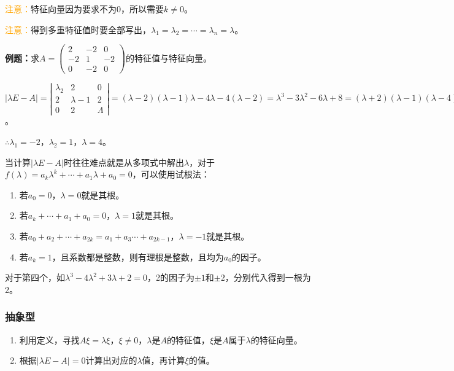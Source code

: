 \documentclass[UTF8, 12pt]{ctexart}
\begin{document}
\textcolor{orange}{注意：}特征向量因为要求不为0，所以需要$k\neq0$。

\textcolor{orange}{注意：}得到多重特征值时要全部写出，$\lambda_1=\lambda_2=\cdots=\lambda_n=\lambda$。

\textbf{例题：}求$A=\left(\begin{array}{ccc}
    2 & -2 & 0 \\
    -2 & 1 & -2 \\
    0 & -2 & 0
\end{array}\right)$的特征值与特征向量。

$\vert\lambda E-A\vert=\left|\begin{array}{ccc}
    \lambda_2 & 2 & 0 \\
    2 & \lambda-1 & 2 \\
    0 & 2 & \Lambda
\end{array}\right|=(\lambda-2)(\lambda-1)\lambda-4\lambda-4(\lambda-2)=\lambda^3-3\lambda^2-6\lambda+8=(\lambda+2)(\lambda-1)(\lambda-4)=0$。

$\therefore\lambda_1=-2$，$\lambda_2=1$，$\lambda=4$。

当计算$\vert\lambda E-A\vert$时往往难点就是从多项式中解出$\lambda$，对于$f(\lambda)=a_k\lambda^k+\cdots+a_1\lambda+a_0=0$，可以使用试根法：

\begin{enumerate}
    \item 若$a_0=0$，$\lambda=0$就是其根。
    \item 若$a_k+\cdots+a_1+a_0=0$，$\lambda=1$就是其根。
    \item 若$a_0+a_2+\cdots+a_{2k}=a_1+a_3\cdots+a_{2k-1}$，$\lambda=-1$就是其根。
    \item 若$a_k=1$，且系数都是整数，则有理根是整数，且均为$a_0$的因子。
\end{enumerate}

对于第四个，如$\lambda^3-4\lambda^2+3\lambda+2=0$，2的因子为$\pm1$和$\pm2$，分别代入得到一根为2。

\subsubsection{抽象型}

\begin{enumerate}
    \item 利用定义，寻找$A\xi=\lambda\xi$，$\xi\neq0$，$\lambda$是$A$的特征值，$\xi$是$A$属于$\lambda$的特征向量。
    \item 根据$\vert\lambda E-A\vert=0$计算出对应的$\lambda$值，再计算$\xi$的值。
\end{enumerate}
\end{document}
